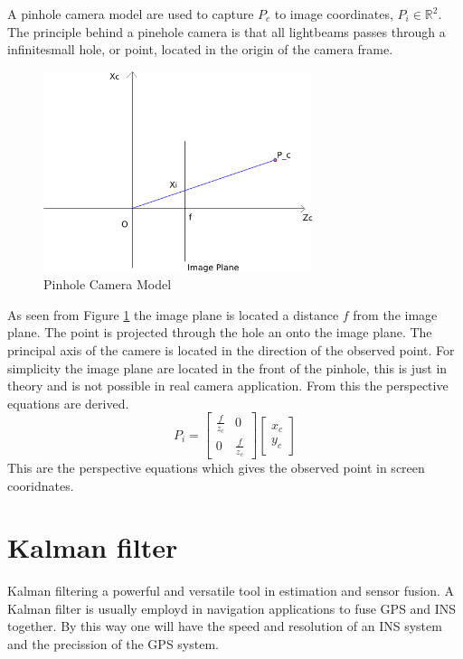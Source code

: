 	A pinhole camera model are used to capture $P_c$ to image coordinates, $P_i \in
	\mathbb{R}^2$. 
	The principle behind a pinehole camera is that all lightbeams passes through a
	infinitesmall hole, or point, located in the origin of the camera frame.   
	\begin{figure}[hbtp]
		\centering
		\includegraphics[width=0.7\textwidth]{pics/pinhole_model2}
		\caption{Pinhole Camera Model}
		\label{fig:ch1-pinhole}
	\end{figure}
			
	As seen from Figure \ref{fig:ch1-pinhole} the image plane is located a distance $f$ from the image plane. 
	The point is projected through the hole an onto the image plane. The principal axis of the camere is located
	in the direction of the observed point. For simplicity the image plane are located in the front of the
	pinhole, this is just in theory and is not possible in real camera application. From this the
	perspective equations are derived. \cite{robotbok}
	\begin{equation}
		\label{eq:ch1-perspective}
		P_i = \left[ \begin{array}{cc}
					\frac{f}{z_c} & 0 \\
					0	& \frac{f}{z_c} 
				\end{array} \right] 
				\left[ \begin{array}{c}
					x_c \\
					y_c
					\end{array} \right]
	\end{equation}
	This are the perspective equations which gives the observed point in screen cooridnates. 

\section{Kalman filter}
	Kalman filtering a powerful and versatile tool in estimation and sensor fusion. A Kalman filter is
	usually employd in navigation applications to fuse GPS and INS together. By this way one will have
	the speed and resolution of an INS system and the precission of the GPS system.
	

